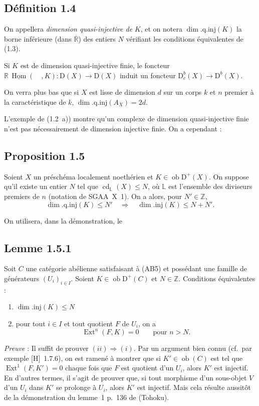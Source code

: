 \documentclass[11pt]{article}
\DeclareMathOperator{\Hom}{Hom}
\DeclareMathOperator{\Ext}{Ext}
\DeclareMathOperator{\cd}{cd}
\newcommand{\D}{\mathrm{D}}
\newcommand{\Z}{\mathbb{Z}}
\newcommand{\ob}{\operatorname{ob}}
\providecommand{\Hom}{\operatorname{Hom}}
\providecommand{\ob}{\operatorname{ob}}
\providecommand{\Z}{\mathbb Z}
\providecommand{\Hom}{\operatorname{Hom}}
\begin{document}
\subsection*{Définition 1.4}
On appellera \emph{dimension quasi-injective de} $K$, et on notera $\dim.\mathrm{q.inj}(K)$ la borne inférieure (dans $\overline{\mathbb{R}}$) des entiers $N$ vérifiant les conditions équivalentes de (1.3).

Si $K$ est de dimension quasi-injective finie, le foncteur $\mathbb{R}\,\underline{\Hom}(\quad,K) : \D(X) \to \D(X)$ induit un foncteur $\D_c^{b}(X) \to \D^{b}(X)$.

On verra plus bas que si $X$ est lisse de dimension $d$ sur un corps $k$ et $n$ premier à la caractéristique de $k$, $\dim.\mathrm{q.inj}(A_X) = 2d$.

L'exemple de (1.2~a)) montre qu'un complexe de dimension quasi-injective finie n'est pas nécessairement de dimension injective finie. On a cependant :

\subsection*{Proposition 1.5}
Soient $X$ un préschéma localement noethérien et $K \in \ob \D^{+}(X)$. On suppose qu'il existe un entier $N$ tel que $\cd_{\mathbb{L}}(X) \leqslant N$, où $\mathbb{L}$ est l'ensemble des diviseurs premiers de $n$ (notation de SGAA~X~1). On a alors, pour $N' \in \Z$,
\[
\dim.\mathrm{q.inj}(K) \leqslant N' \quad \Longrightarrow \quad \dim.\mathrm{inj}(K) \leqslant N + N'.
\]

On utilisera, dans la démonstration, le

\subsection*{Lemme 1.5.1}
Soit $C$ une catégorie abélienne satisfaisant à (AB5) et possédant une famille de générateurs $(U_i)_{i \in I}$. Soient $K \in \ob \D^{+}(C)$ et $N \in \Z$. Conditions équivalentes :
\begin{enumerate}[label=(\roman*)]
\item $\dim.\mathrm{inj}(K) \leqslant N$
\item pour tout $i \in I$ et tout quotient $F$ de $U_i$, on a
\[
\Ext^n(F,K) = 0 \qquad \text{pour } n > N.
\]
\end{enumerate}

\emph{Preuve} : Il suffit de prouver $(ii) \Rightarrow (i)$. Par un argument bien connu (cf.\ par exemple [H]~1.7.6), on est ramené à montrer que si $K' \in \ob(C)$ est tel que $\Ext^1(F,K') = 0$ chaque fois que $F$ est quotient d'un $U_i$, alors $K'$ est injectif. En d'autres termes, il s'agit de prouver que, si tout morphisme d'un sous-objet $V$ d'un $U_i$ dans $K'$ se prolonge à $U_i$, alors $K'$ est injectif. Mais cela résulte aussitôt de la démonstration du lemme~1 p.~136 de (Tohoku).
\end{document}
